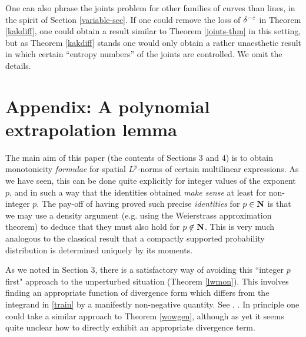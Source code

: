 \begin{remark} One can also phrase the joints problem for other families of
curves than lines, in the spirit of Section \ref{variable-sec}.  If one could
remove the loss of $\delta^{-\varepsilon}$ in Theorem \ref{kakdiff}, one could obtain a result
similar to Theorem \ref{joints-thm} in this setting, but as Theorem \ref{kakdiff} stands
one would only obtain a rather unaesthetic result in which certain ``entropy numbers'' of
the joints are controlled.  We omit the details.
\end{remark}


\section{Appendix: A polynomial extrapolation lemma}

The main aim of this paper (the contents of Sections 3 and 4) is
to obtain monotonicity \textit{formulae} for spatial $L^{p}$-norms
of certain multilinear expressions. As we have seen, this can be
done quite explicitly for integer values of the exponent $p$, and
in such a way that the identities obtained \textit{make sense} at
least for non-integer $p$. The pay-off of having proved such
precise \textit{identities} for $p\in{\hbox{\bf N}}$ is that we may use a
density argument (e.g. using the
Weierstrass approximation theorem) to deduce that they must also
hold for $p\not\in{\hbox{\bf N}}$. This is very much analogous to the
classical result that a compactly supported probability
distribution is determined uniquely by its moments.

\begin{remark}
As we noted in Section 3, there is a satisfactory way of
avoiding this ``integer $p$ first" approach to the unperturbed
situation (Theorem \ref{lwmon}). This involves finding an
appropriate function of divergence form which differs from the
integrand in \eqref{train} by a manifestly non-negative quantity.  See \cite{BCCT}, \cite{CLL}.
In principle one could take a similar approach to Theorem
\ref{wowgen}, although as yet it seems quite unclear how to
directly exhibit an appropriate divergence term.
\end{remark}

